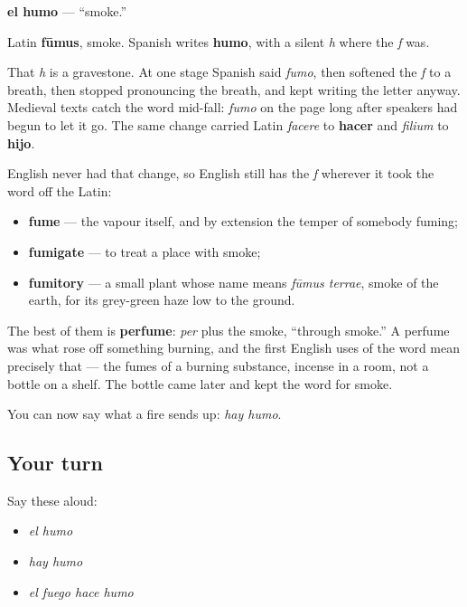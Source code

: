\begin{cousinweb}
\textbf{el humo} — \textquotedblleft{}smoke.\textquotedblright{}

Latin \textbf{fūmus}, smoke. Spanish writes \textbf{humo}, with a silent \emph{h} where the \emph{f} was.

That \emph{h} is a gravestone. At one stage Spanish said \emph{fumo}, then softened the \emph{f} to a breath, then stopped pronouncing the breath, and kept writing the letter anyway. Medieval texts catch the word mid-fall: \emph{fumo} on the page long after speakers had begun to let it go. The same change carried Latin \emph{facere} to \textbf{hacer} and \emph{filium} to \textbf{hijo}.

English never had that change, so English still has the \emph{f} wherever it took the word off the Latin:

\begin{itemize}
\raggedright
  \item \textbf{fume} — the vapour itself, and by extension the temper of somebody fuming;
  \item \textbf{fumigate} — to treat a place with smoke;
  \item \textbf{fumitory} — a small plant whose name means \emph{fūmus terrae}, smoke of the earth, for its grey-green haze low to the ground.
\end{itemize}

The best of them is \textbf{perfume}: \emph{per} plus the smoke, \textquotedblleft{}through smoke.\textquotedblright{} A perfume was what rose off something burning, and the first English uses of the word mean precisely that — the fumes of a burning substance, incense in a room, not a bottle on a shelf. The bottle came later and kept the word for smoke.
\end{cousinweb}

\begin{grammarlens}[title={What you've built}]
You can now say what a fire sends up: \emph{hay humo}.
\end{grammarlens}

\subsection*{Your turn}
Say these aloud:

\begin{itemize}
\raggedright
  \item \emph{el humo}
  \item \emph{hay humo}
  \item \emph{el fuego hace humo}
\end{itemize}

